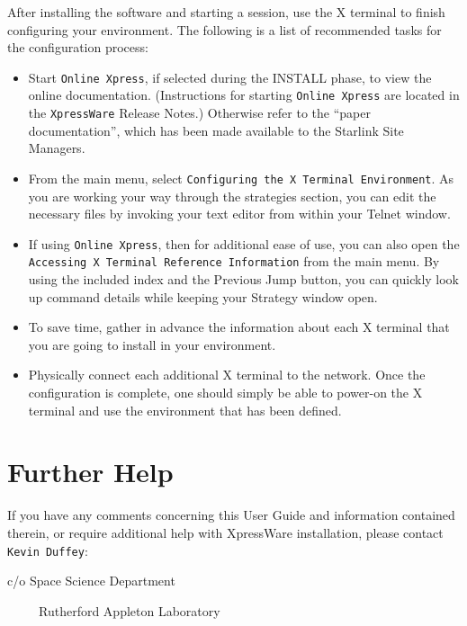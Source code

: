 After installing the software and starting a session, use the X terminal to
finish configuring your environment. The following is a list of recommended
tasks for the configuration process:

\begin {itemize}

\item Start {\tt Online Xpress}, if selected during the INSTALL phase, to view
the online documentation. (Instructions for starting {\tt Online Xpress} are
located in the {\tt XpressWare} Release Notes.) Otherwise refer to the ``paper
documentation'', which has been made available to the Starlink Site Managers.

\item From the main menu, select {\tt Configuring the X Terminal Environment}.
As you are working your way through the strategies section, you can edit the
necessary files by invoking your text editor from within your Telnet window.

\item If using {\tt Online Xpress}, then for additional ease of use, you can
also open the {\tt Accessing X Terminal Reference Information} from the main
menu. By using the included index and the Previous Jump button, you can quickly
look up command details while keeping your Strategy window open.

\item To save time, gather in advance the information about each X terminal
that you are going to install in your environment.

\item Physically connect each additional X terminal to the network. Once the
configuration is complete, one should simply be able to power-on the X terminal
and use the environment that has been defined.

\end {itemize}


\section {Further Help}

If you have any comments concerning this User Guide and information contained
therein, or require additional help with XpressWare installation, please
contact {\tt Kevin Duffey}:

c/o Space Science Department

\ \ \ \ \ Rutherford Appleton Laboratory

